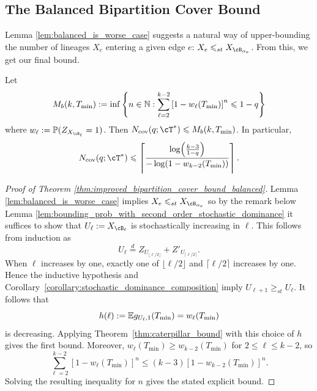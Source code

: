 \subsection{The Balanced Bipartition Cover Bound}
\label{sec:balanced-bipartition-cover-bound}

Lemma \ref{lem:balanced_is_worse_case} suggests a natural way of upper-bounding
the number of lineages $X_e$ entering a given edge $e$: $X_e \leq_{st} X_{\cB_{\alpha_e}}$. From this, we get our final bound.


\begin{theorem}
\label{thm:improved_bipartition_cover_bound_balanced}
 Let
\begin{equation}
    M_b(k, T_{\mathrm{min}}):=  \inf\left\{n \in \mathbb{N} : \sum_{\ell=2}^{k-2}\left[1-w_\ell(T_{\mathrm{min}})\right]^n \leqslant 1-q\right\}
\label{eqn:balanced-bound}
\end{equation}
%
\noindent where $w_\ell := \P(Z_{X_{\cB_\ell}} = 1)$. Then $N_{\mathrm{cov}}(q;\cT^*)\leq M_b(k,T_{\mathrm{min}})$. In particular,
\[
N_{\mathrm{cov}}(q;\cT^*)\leq \left\lceil
    \frac{\log\!\left(\frac{k-3}{1-q}\right)}
         {-\log\!\left(1-w_{k-2}(T_{\mathrm{min}})\right)}
\right\rceil.
\]
\end{theorem}


\begin{proof}[Proof of Theorem \ref{thm:improved_bipartition_cover_bound_balanced}]
    Lemma \ref{lem:balanced_is_worse_case} implies $X_e \leq_{st} X_{\cB_{\alpha_e}}$
    so by the remark below Lemma \ref{lem:bounding_prob_with_second_order_stochastic_dominance} it
    suffices to show that $U_\ell := X_{\cB_\ell}$ is stochastically increasing in $\ell$. This follows from
    induction as
        \[U_\ell \overset{d}{=} Z_{U_{\lfloor \ell/2 \rfloor}} + Z'_{U_{\lceil \ell/2 \rceil}}.\]
    \noindent When $\ell$ increases by one, exactly one of $\lfloor \ell/2\rfloor$ and
    $\lceil \ell/2\rceil$ increases by one. Hence the inductive hypothesis and
    Corollary~\ref{corollary:stochastic_dominance_composition} imply
    $U_{\ell+1} \geq_{st} U_\ell$. It follows that
    \[
        h(\ell):=\mathbb{E} g_{U_\ell,1}(T_{\mathrm{min}})=w_\ell(T_{\mathrm{min}})
    \]
    is decreasing. Applying Theorem~\ref{thm:caterpillar_bound} with this choice of
    $h$ gives the first bound. Moreover,
    $w_\ell(T_{\mathrm{min}})\geq w_{k-2}(T_{\mathrm{min}})$ for
    $2\leq\ell\leq k-2$, so
    \[
    \sum_{\ell=2}^{k-2}\left[1-w_\ell(T_{\mathrm{min}})\right]^n
    \leq (k-3)\left[1-w_{k-2}(T_{\mathrm{min}})\right]^n.
    \]
    Solving the resulting inequality for $n$ gives the stated explicit bound.
\end{proof}

